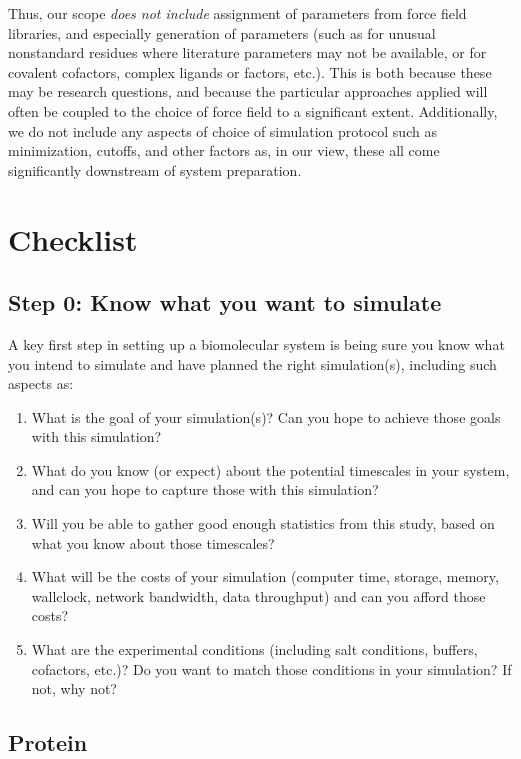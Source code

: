 \documentclass[9pt,bestpractices]{livecoms}
\begin{document}
Thus, our scope \emph{does not include} assignment of parameters from force field libraries, and especially generation of parameters (such as for unusual nonstandard residues where literature parameters may not be available, or for covalent cofactors, complex ligands or factors, etc.). 
This is both because these may be research questions, and because the particular approaches applied will often be coupled to the choice of force field to a significant extent.
Additionally, we do not include any aspects of choice of simulation protocol such as minimization, cutoffs, and other factors as, in our view, these all come significantly downstream of system preparation. 

\section{Checklist}

\subsection{ Step 0: Know what you want to simulate }

A key first step in setting up a biomolecular system is being sure you know what you intend to simulate and have planned the right simulation(s), including such aspects as:
\begin{enumerate}
\item What is the goal of your simulation(s)? Can you hope to achieve those goals with this simulation?
\item What do you know (or expect) about the potential timescales in your system, and can you hope to capture those with this simulation?
\item Will you be able to gather good enough statistics from this study, based on what you know about those timescales?
\item What will be the costs of your simulation (computer time, storage, memory, wallclock, network bandwidth, data throughput) and can you afford those costs? 
\item What are the experimental conditions (including salt conditions, buffers, cofactors, etc.)? Do you want to match those conditions in your simulation? If not, why not?
\end{enumerate}


\subsection{Protein} 
\end{document}
